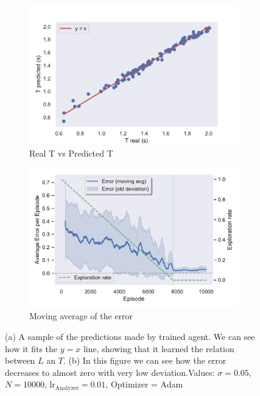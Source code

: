 \documentclass[11pt,a4paper,twoside]{report}
\newcommand{\+}{\textnormal{+} }
\theoremstyle{definition}
\numberwithin{equation}{chapter}
\begin{document}
  
\begin{figure}[t]
  \centering
  \begin{subfigure}{.5\textwidth}
    \centering
    \includegraphics[width=1\linewidth]{figures/Real-vs-Pred-Pendulum.pdf}
    \caption{Real T vs Predicted T}
    \label{fig:RealvsPredictedPendulum}
  \end{subfigure}%
  \begin{subfigure}{.5\textwidth}
    \centering
    \includegraphics[width=1\linewidth]{figures/Error-Pendulum.pdf}
    \caption{Moving average of the error}
    \label{fig:ErrorAveragePendulum}
  \end{subfigure}
  \caption{(a) A sample of the predictions made by trained agent. We can see
  how it fits the $y=x$ line, showing that it learned the relation between
  $L$ an $T$. (b) In this figure we can see how the error decreases to almost 
  zero with very low deviation.Values: $\sigma=0.05$, $N=10000$,
  $\text{lr}_\text{Analyzer}=0.01$, Optimizer = Adam
  }
  \label{fig:PendulumError}
  \end{figure}
\end{document}
